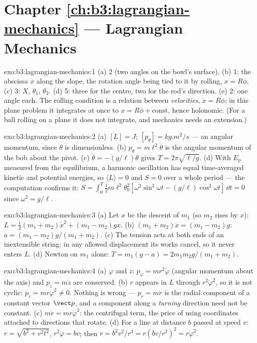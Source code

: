 \section*{Chapter \ref{ch:b3:lagrangian-mechanics} --- Lagrangian Mechanics}

\begin{solution}{exo:b3:lagrangian-mechanics:1}
(a) 2 (two angles on the bowl's surface). (b) 1: the abscissa $x$ along
the slope, the rotation angle being tied to it by rolling, $x =
R\phi$. (c) 3: $X$, $\theta_1$, $\theta_2$. (d) 5: three for the
centre, two for the rod's direction. (e) 2: one angle each. The
rolling condition is a relation between \emph{velocities}, $\dot x =
R\dot\phi$; in this plane problem it integrates at once to $x = R\phi +
\text{const}$, hence holonomic. (For a ball rolling on a plane it does
not integrate, and  mechanics needs an extension.)
\end{solution}

\begin{solution}{exo:b3:lagrangian-mechanics:2}
(a) $[L] = \unit{J}$; $[p_\theta] = \unit{kg.m^2/s}$ --- an angular
momentum, since $\theta$ is dimensionless. (b) $p_\theta =
m\ell^2\dot\theta$ is the angular momentum of the bob about the pivot.
(c) $\ddot\theta = -(g/\ell)\theta$ gives $T = 2\pi\sqrt{\ell/g}$. (d)
With $E_p$ measured from the equilibrium, a harmonic oscillation has
equal time-averaged kinetic and potential energies, so $\langle
L\rangle = 0$ and $S = 0$ over a whole period --- the computation
confirms it: $S = \int_0^T\tfrac12 m\ell^2\theta_0^2[\omega^2\sin^2
\omega t - (g/\ell)\cos^2\omega t]\,\dd t = 0$ since $\omega^2 =
g/\ell$.
\end{solution}

\begin{solution}{exo:b3:lagrangian-mechanics:3}
(a) Let $x$ be the descent of $m_1$ (so $m_2$ rises by $x$): $L =
\tfrac12(m_1 + m_2)\dot x^2 + (m_1 - m_2)gx$. (b) $(m_1 + m_2)\ddot x =
(m_1 - m_2)g$: $a = (m_1 - m_2)g/(m_1 + m_2)$. (c) The tension acts at
both ends of an inextensible string: in any allowed displacement its
works cancel, so it never enters $L$. (d) Newton on $m_1$ alone: $T =
m_1(g - a) = 2m_1m_2g/(m_1 + m_2)$.
\end{solution}

\begin{solution}{exo:b3:lagrangian-mechanics:4}
(a) $\varphi$ and $z$: $p_\varphi = mr^2\dot\varphi$ (angular momentum
about the axis) and $p_z = m\dot z$ are conserved. (b) $r$ appears in
$L$ through $r^2\dot\varphi^2$, so it is not cyclic: $\dot p_r =
mr\dot\varphi^2 \neq 0$. Nothing is wrong --- $p_r = m\dot r$ is the
radial component of a constant vector $\vect p$, and a component along
a \emph{turning} direction need not be constant. (c) $m\ddot r =
mr\dot\varphi^2$: the centrifugal term, the price of using coordinates
attached to directions that rotate. (d) For a line at distance $b$
passed at speed $v$: $r = \sqrt{b^2 + v^2t^2}$, $r^2\dot\varphi = bv$;
then $\ddot r = b^2v^2/r^3 = r(bv/r^2)^2 = r\dot\varphi^2$.
\end{solution}

